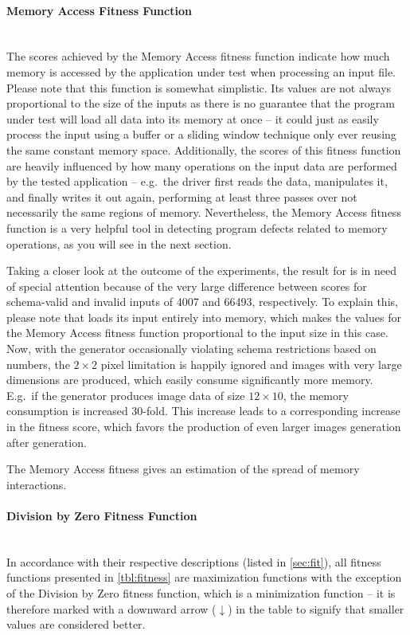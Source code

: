 \paragraph{Memory Access Fitness Function} ~\\
The scores achieved by the Memory Access fitness function indicate how much memory is accessed by the
application under test when processing an input file. Please note that this function is somewhat simplistic.
Its values are not always proportional to the size of the inputs as there is no guarantee that the program
under test will load all data into its memory at once -- it could just as easily process the input using a
buffer or a sliding window technique only ever reusing the same constant memory space.
Additionally, the scores of this fitness function are heavily influenced by how many operations on the input
data are performed by the tested application -- e.g.\ the \libpng driver first reads the data, manipulates
it, and finally writes it out again, performing at least three passes over not necessarily the same regions of
memory. Nevertheless, the Memory Access fitness function is a very helpful tool in detecting program defects
related to memory operations, as you will see in the next section. 

Taking a closer look at the outcome of the experiments, the result for \libpng is in need of special
attention because of the very large difference between scores for schema-valid and invalid inputs of 4007 and
66493, respectively. To explain this, please note that \libpng loads its input entirely into memory, which
makes the values for the Memory Access fitness function proportional to the input size in this case. Now, with
the generator occasionally violating schema restrictions based on numbers, the $2\times 2$ pixel limitation is
happily ignored and images with very large dimensions are produced, which easily consume significantly more
memory. E.g.\ if the generator produces image data of size $12 \times 10$, the memory consumption is increased
30-fold. This increase leads to a corresponding increase in the fitness score, which favors the production
of even larger images generation after generation.

\begin{mdframed}
\centering
The Memory Access fitness gives an estimation of the spread of memory interactions.
\end{mdframed}

\paragraph{Division by Zero Fitness Function} ~\\
In accordance with their respective descriptions (listed in \cref{sec:fit}), all fitness functions
presented in \cref{tbl:fitness} are maximization functions with the exception of the Division by Zero fitness
function, which is a minimization function -- it is therefore marked with a downward arrow ($\downarrow$) in the
table to signify that smaller values are considered better.

